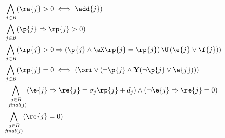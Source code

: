 \begin{align*}
& \bigwedge_{
\begin{subarray}{c}
\,j \in B
\end{subarray}
} ( \ra{j} > 0 \iff \add{j}) \\
%
%
%
%
%
& \bigwedge_{
\begin{subarray}{c}
\,j \in B
\end{subarray}
} ( \p{j} \Rightarrow \rp{j} > 0 ) \\
%
%
%
& \bigwedge_{
\begin{subarray}{c}
\,j \in B
\end{subarray}
} ( \rp{j} > 0 \Rightarrow (\p{j} \land \aX \rp{j}=\rp{j}) \, \U \, (\e{j}\lor \f{j})) \\
%
%
%
& \bigwedge_{
\begin{subarray}{c}
\,j \in B
\end{subarray}
} ( \rp{j} = 0 \iff (\ori \lor (\neg\p{j} \land  \mathbf{Y}(\neg\p{j} \lor \e{j}) )) \\
%
%
%
%
& \bigwedge_{
\begin{subarray}{c}
\,j \in B\\
\lnot \mathit{final}(j)
\end{subarray}
} ( \e{j} \Rightarrow \re{j} = \sigma_j \rp{j} + d_j ) \land (\lnot \e{j} \Rightarrow \re{j} = 0 )\\
%
%
& \bigwedge_{
\begin{subarray}{c}
\,j \in B\\
\mathit{final}(j)
\end{subarray}
} ( \re{j} = 0) 
%
%
%
\end{align*}
